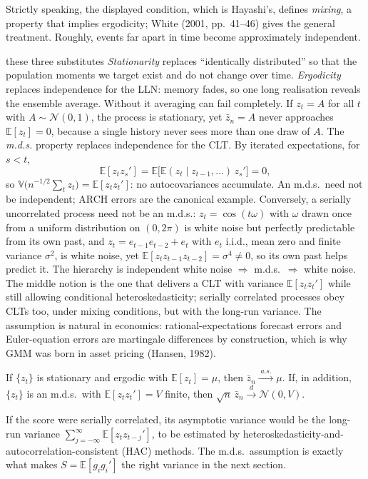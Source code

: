 \documentclass[11pt,a4paper]{article}
\newcommand{\E}{\mathbb{E}}
\newcommand{\V}{\mathbb{V}}
\newcommand{\N}{\mathcal{N}}
\newcommand{\cd}{\xrightarrow{\;d\;}}
\newcommand{\cas}{\xrightarrow{\;a.s.\;}}
\newcommand{\iid}{i.i.d.}
\begin{document}
Strictly speaking, the displayed condition, which is Hayashi's, defines \emph{mixing}, a property that implies ergodicity; White (2001, pp.~41--46) gives the general treatment. Roughly, events far apart in time become approximately independent.

\begin{whybox}{these three substitutes}
\emph{Stationarity} replaces ``identically distributed'' so that the population moments we target exist and do not change over time. \emph{Ergodicity} replaces independence for the LLN: memory fades, so one long realisation reveals the ensemble average. Without it averaging can fail completely. If $z_t=A$ for all $t$ with $A\sim\N(0,1)$, the process is stationary, yet $\bar z_n=A$ never approaches $\E[z_t]=0$, because a single history never sees more than one draw of $A$. The \emph{m.d.s.} property replaces independence for the CLT. By iterated expectations, for $s<t$,
\[
\E[z_tz_s']=\E\big[\E(z_t\mid z_{t-1},\dots)\,z_s'\big]=0,
\]
so $\V\big(n^{-1/2}\sum_tz_t\big)=\E[z_tz_t']$: no autocovariances accumulate. An m.d.s.\ need not be independent; ARCH errors are the canonical example. Conversely, a serially uncorrelated process need not be an m.d.s.: $z_t=\cos(t\omega)$ with $\omega$ drawn once from a uniform distribution on $(0,2\pi)$ is white noise but perfectly predictable from its own past, and $z_t=e_{t-1}e_{t-2}+e_t$ with $e_t$ \iid, mean zero and finite variance $\sigma^2$, is white noise, yet $\E[z_tz_{t-1}z_{t-2}]=\sigma^4\neq0$, so its own past helps predict it. The hierarchy is independent white noise $\Rightarrow$ m.d.s.\ $\Rightarrow$ white noise. The middle notion is the one that delivers a CLT with variance $\E[z_tz_t']$ while still allowing conditional heteroskedasticity; serially correlated processes obey CLTs too, under mixing conditions, but with the long-run variance. The assumption is natural in economics: rational-expectations forecast errors and Euler-equation errors are martingale differences by construction, which is why GMM was born in asset pricing (Hansen, 1982).
\end{whybox}

\begin{theorem}
If $\{z_t\}$ is stationary and ergodic with $\E[z_t]=\mu$, then $\bar z_n\cas\mu$. If, in addition, $\{z_t\}$ is an m.d.s.\ with $\E[z_tz_t']=V$ finite, then $\sqrt n\,\bar z_n\cd\N(0,V)$.
\end{theorem}

If the score were serially correlated, its asymptotic variance would be the long-run variance $\sum_{j=-\infty}^{\infty}\E[z_tz_{t-j}']$, to be estimated by heteroskedasticity-and-autocorrelation-consistent (HAC) methods. The m.d.s.\ assumption is exactly what makes $S=\E[g_ig_i']$ the right variance in the next section.
\end{document}
